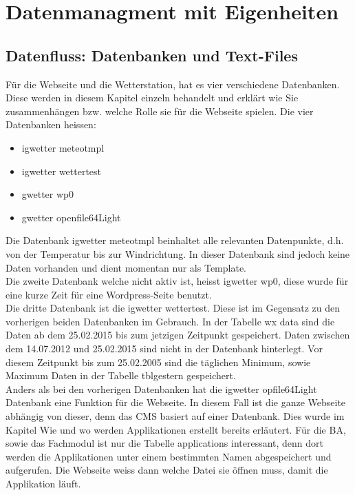 \section{Datenmanagment mit Eigenheiten}

\subsection{Datenfluss: Datenbanken und Text-Files}



Für die Webseite und die Wetterstation, hat es vier verschiedene Datenbanken. Diese werden in diesem Kapitel einzeln behandelt und erklärt wie Sie zusammenhängen bzw. welche Rolle sie für die Webseite spielen. Die vier Datenbanken heissen:
\begin{itemize}  
\item igwetter meteotmpl
\item igwetter wettertest
\item gwetter wp0
\item gwetter openfile64Light
\end{itemize}

Die Datenbank igwetter meteotmpl beinhaltet alle relevanten Datenpunkte, d.h. von der Temperatur bis zur Windrichtung. In dieser Datenbank sind jedoch keine Daten vorhanden und dient momentan nur als Template.\\
Die zweite Datenbank welche nicht aktiv ist, heisst igwetter wp0, diese wurde für eine kurze Zeit für eine Wordpress-Seite benutzt.\\


Die dritte Datenbank ist die igwetter wettertest. Diese ist im Gegensatz zu den vorherigen beiden Datenbanken im Gebrauch. In der Tabelle wx data sind die Daten ab dem 25.02.2015 bis zum jetzigen Zeitpunkt gespeichert. Daten zwischen dem 14.07.2012 und 25.02.2015 sind nicht in der Datenbank hinterlegt. Vor diesem Zeitpunkt bis zum 25.02.2005 sind die täglichen Minimum, sowie Maximum Daten in der Tabelle tblgestern gespeichert.\\
Anders als bei den vorherigen Datenbanken hat die igwetter opfile64Light Datenbank eine Funktion für die Webseite. In diesem Fall ist die ganze Webseite abhängig von dieser, denn das CMS basiert auf einer Datenbank. Dies wurde im Kapitel Wie und wo werden Applikationen erstellt bereits erläutert. Für die BA, sowie das Fachmodul ist nur die Tabelle applications interessant, denn dort werden die Applikationen unter einem bestimmten Namen abgespeichert und aufgerufen. Die Webseite weiss dann welche Datei sie öffnen muss, damit die Applikation läuft.\\



